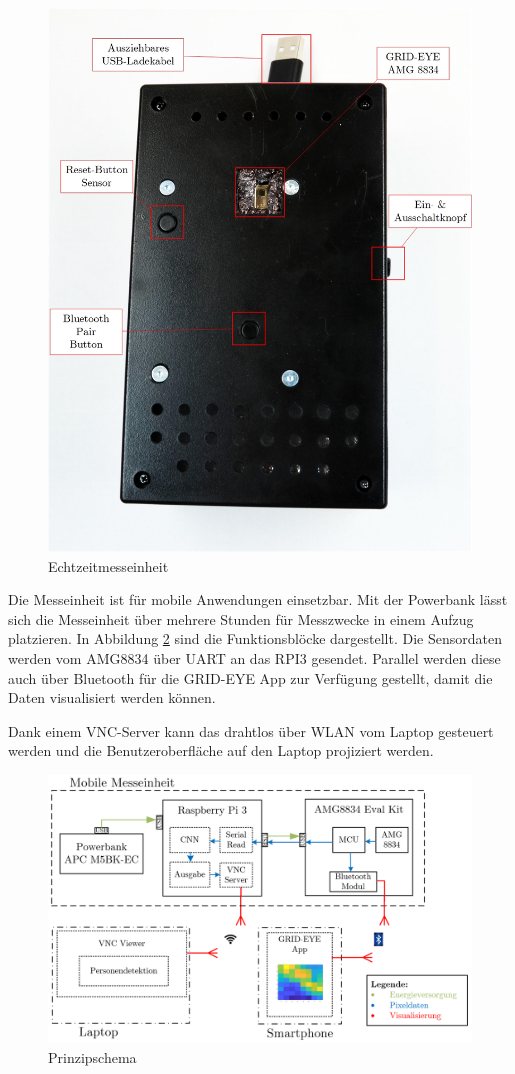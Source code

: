 \begin{figure}[H]
	\centering
	\includegraphics[width=0.8\linewidth]{fig/Echtzeitmessgeraet.jpg}
	\caption{Echtzeitmesseinheit}
	\label{fig:einheit1}
\end{figure}

Die Messeinheit ist für mobile Anwendungen einsetzbar. Mit der Powerbank lässt sich die Messeinheit über mehrere Stunden für Messzwecke in einem Aufzug platzieren. In Abbildung \ref{fig:einheit2}  sind die Funktionsblöcke dargestellt. Die Sensordaten werden vom AMG8834 über \ac{UART} an das \ac{RPI3} gesendet. Parallel werden diese auch über Bluetooth für die GRID-EYE App zur Verfügung gestellt, damit die Daten visualisiert werden können.

Dank einem VNC-Server kann das  drahtlos über WLAN vom Laptop gesteuert werden und die Benutzeroberfläche auf den Laptop projiziert werden. 

\begin{figure}[H]
	\centering
	\includegraphics[width=0.9\linewidth]{fig/Messeinheit.png}
	\caption{Prinzipschema}
	\label{fig:einheit2}
\end{figure}

